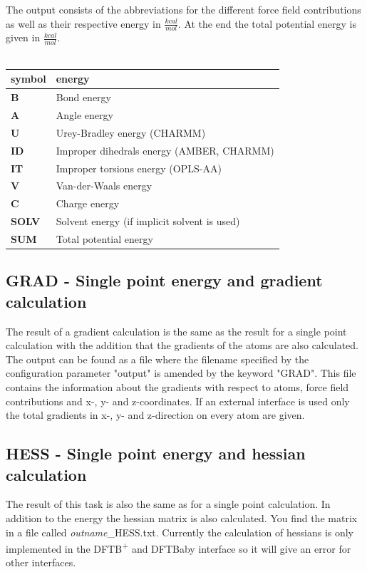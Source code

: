 \documentclass[10pt,a4paper]{article} %
\begin{document}
	The output consists of the abbreviations for the different force field contributions as well as their respective energy in $\frac{kcal}{mol}$. At the end the total potential energy is given in $\frac{kcal}{mol}$.\\~\\

	\begin{longtable}{l|l}
		symbol & energy\\
		\hline
		\textbf{B} & Bond energy\\
		\textbf{A} & Angle energy\\
		\textbf{U} & Urey-Bradley energy (\ac{CHARMM})\\
		\textbf{ID} & Improper dihedrals energy (\ac{AMBER}, \ac{CHARMM})\\
		\textbf{IT} & Improper torsions energy (\ac{OPLS-AA})\\
		\textbf{V} & Van-der-Waals energy\\
		\textbf{C} & Charge energy\\
		\textbf{SOLV} & Solvent energy (if implicit solvent is used)\\
		\textbf{SUM} & Total potential energy\\

	\end{longtable}


	\subsection{GRAD - Single point energy and gradient calculation}
	The result of a gradient calculation is the same as the result for a single point calculation with the addition that the gradients of the atoms are also calculated. The output can be found as a file where the filename specified by the configuration parameter "output" is amended by the keyword "GRAD". This file contains the information about the gradients with respect to atoms, force field contributions and x-, y- and z-coordinates. If an external interface is used only the total gradients in x-, y- and z-direction on every atom are given.
	
	\subsection{HESS - Single point energy and hessian calculation}
	The result of this task is also the same as for a single point calculation. In addition to the energy the hessian matrix is also calculated. You find the matrix in a file called \textit{outname}\_HESS.txt. Currently the calculation of hessians is only implemented in the DFTB\textsuperscript{+} and DFTBaby interface so it will give an error for other interfaces.
	
\end{document}
